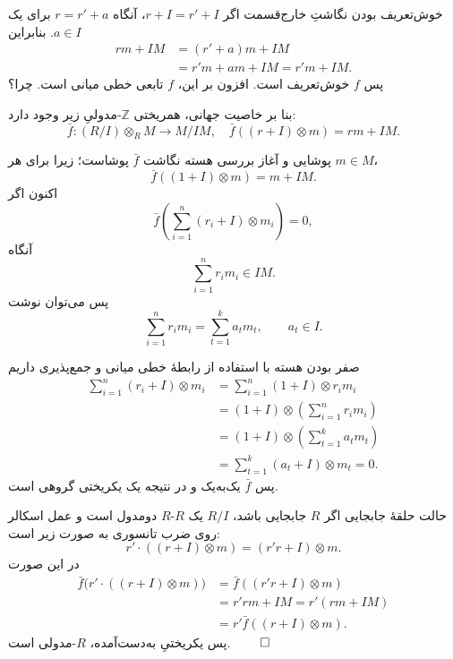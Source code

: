 \begin{frame}[t]{خوش‌تعریف بودن نگاشتِ خارج‌قسمت}
\label{lec20:quotient-well-defined}
اگر \(r+I=r'+I\)، آنگاه \(r=r'+a\) برای یک \(a\in I\). بنابراین
\[
\begin{aligned}
    rm+IM&=(r'+a)m+IM\\
          &=r'm+am+IM=r'm+IM.
\end{aligned}
\]
پس \(f\) خوش‌تعریف است. افزون بر این، \(f\) تابعی خطی میانی است. \alert{چرا؟}
\medskip

بنا بر خاصیت جهانی، همریختی \(\mathbb Z\)-مدولیِ زیر وجود دارد:
\[
    \bar f:(R/I)\otimes_R M\longrightarrow M/IM,
    \quad\bar f((r+I)\otimes m)=rm+IM.
\]
\end{frame}

\begin{frame}[t]{پوشایی و آغاز بررسی هسته}
\label{lec20:quotient-kernel-setup}
نگاشت \(\bar f\) پوشاست؛ زیرا برای هر \(m\in M\)،
\[
    \bar f((1+I)\otimes m)=m+IM.
\]
اکنون اگر
\[
    \bar f\left(\sum_{i=1}^n(r_i+I)\otimes m_i\right)=0,
\]
آنگاه
\[
    \sum_{i=1}^n r_i m_i\in IM.
\]
پس می‌توان نوشت
\[
    \sum_{i=1}^n r_i m_i=\sum_{t=1}^k a_t m_t,\qquad a_t\in I.
\]
\end{frame}

\begin{frame}[t]{صفر بودن هسته}
\label{lec20:quotient-injective}
با استفاده از رابطهٔ خطی میانی و جمع‌پذیری داریم
\[
\begin{aligned}
\sum_{i=1}^n(r_i+I)\otimes m_i
  &=\sum_{i=1}^n(1+I)\otimes r_i m_i\\
  &=(1+I)\otimes\left(\sum_{i=1}^n r_i m_i\right)\\
  &=(1+I)\otimes\left(\sum_{t=1}^k a_t m_t\right)\\
  &=\sum_{t=1}^k(a_t+I)\otimes m_t=0.
\end{aligned}
\]
پس \(\bar f\) یک‌به‌یک و در نتیجه یک یکریختی گروهی است.
\end{frame}

\begin{frame}[t]{حالت حلقهٔ جابجایی}
\label{lec20:quotient-linear}
اگر \(R\) جابجایی باشد، \(R/I\) یک \(R\)-\(R\) دومدول است و عمل اسکالر روی ضرب تانسوری به صورت زیر است:
\[
    r'\cdot((r+I)\otimes m)=(r'r+I)\otimes m.
\]
در این صورت
\[
\begin{aligned}
\bar f\bigl(r'\cdot((r+I)\otimes m)\bigr)
  &=\bar f((r'r+I)\otimes m)\\
  &=r'rm+IM=r'(rm+IM)\\
  &=r'\bar f((r+I)\otimes m).
\end{aligned}
\]
پس یکریختیِ به‌دست‌آمده، \(R\)-مدولی است. \hfill\(\qed\)
\end{frame}

